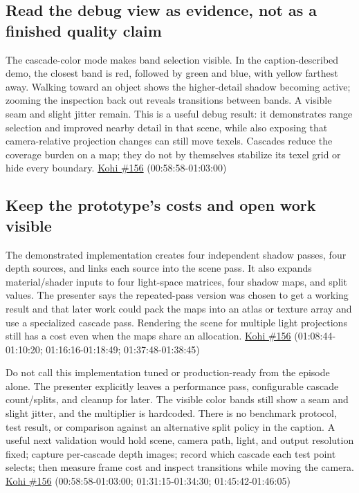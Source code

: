 \subsection{Read the debug view as evidence, not as a finished quality claim}\label{06-engine-ii-ch026-read-the-debug-view-as-evidence-not-as-a-finished-quality-claim}

The cascade-color mode makes band selection visible. In the caption-described demo, the closest band is red, followed by green and blue, with yellow farthest away. Walking toward an object shows the higher-detail shadow becoming active; zooming the inspection back out reveals transitions between bands. A visible seam and slight jitter remain. This is a useful debug result: it demonstrates range selection and improved nearby detail in that scene, while also exposing that camera-relative projection changes can still move texels. Cascades reduce the coverage burden on a map; they do not by themselves stabilize its texel grid or hide every boundary. \href{https://www.youtube.com/watch?v=coWS_saBPBk}{Kohi \#156} (00:58:58-01:03:00)

\subsection{Keep the prototype's costs and open work visible}\label{06-engine-ii-ch026-keep-the-prototypes-costs-and-open-work-visible}

The demonstrated implementation creates four independent shadow passes, four depth sources, and links each source into the scene pass. It also expands material/shader inputs to four light-space matrices, four shadow maps, and split values. The presenter says the repeated-pass version was chosen to get a working result and that later work could pack the maps into an atlas or texture array and use a specialized cascade pass. Rendering the scene for multiple light projections still has a cost even when the maps share an allocation. \href{https://www.youtube.com/watch?v=coWS_saBPBk}{Kohi \#156} (01:08:44-01:10:20; 01:16:16-01:18:49; 01:37:48-01:38:45)

Do not call this implementation tuned or production-ready from the episode alone. The presenter explicitly leaves a performance pass, configurable cascade count/splits, and cleanup for later. The visible color bands still show a seam and slight jitter, and the multiplier is hardcoded. There is no benchmark protocol, test result, or comparison against an alternative split policy in the caption. A useful next validation would hold scene, camera path, light, and output resolution fixed; capture per-cascade depth images; record which cascade each test point selects; then measure frame cost and inspect transitions while moving the camera. \href{https://www.youtube.com/watch?v=coWS_saBPBk}{Kohi \#156} (00:58:58-01:03:00; 01:31:15-01:34:30; 01:45:42-01:46:05)

